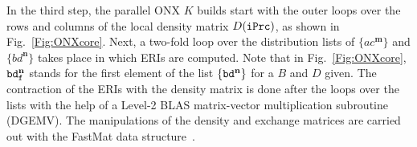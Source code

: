 \documentclass[prl,preprint,doublespace]{revtex4} %
\newcommand{\commentoutA}[1]{}
\begin{document}
\commentoutA{

\begin{figure}[htbp]
  \centering
  \caption{\protect
    Parallel ordering of significant distributions. 
  }\label{Fig:List}
  \begin{equation*}
    \begin{split}
      &\tt          DO\,C\in COL(D(iPrc))\\
      &\tt          DO\,A=1,NAtoms\\
      &\tt\quad       DO\,\mathbf{m}=1,NCell\\
      &\tt\qquad        DO\,c\in C\\
      &\tt\qquad        DO\,a\in A\\
      &\tt\qquad\quad     COMPUTE\,|(ac^\mathbf{m}|ac^\mathbf{m})_{mic}|^{1/2}\\
      &\tt\qquad\quad     IF(|(ac^\mathbf{m}|ac^\mathbf{m})_{mic}|^{1/2}<{\tt Thresh)\,CYCLE}\\
      &\tt\qquad\quad     ADD\,ac^\mathbf{m}\,{\tt to}\, \{ac^\mathbf{m}\}(A,C)\\
      &\tt\qquad        ENDDO\\
      &\tt\qquad        ENDDO\\
      &\tt\quad       ENDDO\\
      &\tt\quad       SORT\,\{ac^\mathbf{m}\}(A,C)\,by\,decreasing\,|(ac^\mathbf{m}|ac^\mathbf{m})_{mic}|^{1/2}\\
      &\tt         ENDDO\\
      &\tt         ENDDO
    \end{split}
  \end{equation*}
\end{figure}

}%

In the third step, the parallel ONX $K$ builds start with the outer loops over
the rows and columns of the local density matrix $D({\tt iPrc})$, 
as shown in Fig.~\ref{Fig:ONXcore}. Next, a two-fold loop over
the distribution lists of $\{ac^\mathbf{m}\}$ and $\{bd^\mathbf{n}\}$
takes place in which ERIs are computed. Note that in Fig.~\ref{Fig:ONXcore}, ${\tt bd_f^\mathbf{n}}$ stands
for the first element of the list ${\tt {\tt \{bd^\mathbf{n}}\}}$ for a $B$ and $D$ given. The contraction of 
the ERIs with the density matrix is done after the loops over the lists with the help of a 
Level-2 BLAS matrix-vector multiplication subroutine (DGEMV).
The manipulations of the density and exchange matrices are 
carried out with the {\sc FastMat} data structure~\cite{CGan04B}.
\end{document}
